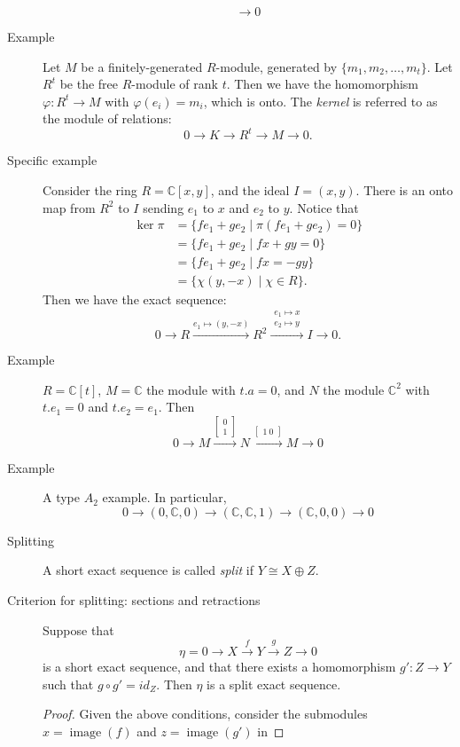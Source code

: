 \documentclass[12pt]{article}
\newcommand{\bbC}{\mathbb{C}}
\newcommand{\image}{\operatorname{image}}
\begin{document}
\begin{description}
\[    \rightarrow 0 \]
\item[Example] Let $M$ be a finitely-generated $R$-module, generated by
  $\{m_1,m_2,\dotsc, m_t\}$. Let $R^t$ be the free $R$-module of rank
  $t$. Then we have the homomorphism $\varphi: R^t \rightarrow M$ with
  $\varphi(e_i) = m_i$, which is onto. The \emph{kernel} is referred
  to as the module of relations: \[0 \rightarrow K \rightarrow R^t
    \rightarrow M \rightarrow 0.\]
\item[Specific example] Consider the ring $R=\bbC[x,y]$, and the ideal
  $I=(x,y).$ There is an onto map from $R^2$ to $I$ sending $e_1$ to
  $x$ and $e_2$ to $y$. Notice that
  \begin{align*}
    \ker \pi &= \{fe_1+ge_2 \mid \pi(fe_1+ge_2)=0\}\\
    &= \{fe_1+ge_2 \mid fx+gy=0\}\\
    &= \{fe_1+ge_2 \mid fx=-gy\}\\
    &= \{\chi (y,-x) \mid \chi \in R\}.
  \end{align*}
Then we have the exact sequence: 
  \[0 \rightarrow R\xrightarrow{e_1 \mapsto (y,-x)} R^2
    \xrightarrow{\begin{matrix} e_1 \mapsto x\\ e_2 \mapsto y\end{matrix}} I\rightarrow 0.\]
\item[Example] $R=\bbC[t]$, $M=\bbC$ the module with $t.a=0$, and $N$
  the module $\bbC^2$ with $t.e_1=0$ and
  $t.e_2=e_1$. Then \[0\rightarrow M \xrightarrow{\begin{bmatrix} 0\\1\end{bmatrix}} N
    \xrightarrow{\begin{bmatrix} 1\ 0\end{bmatrix} } M \rightarrow 0\]
\item[Example] A type $A_2$ example. In particular, \[0\rightarrow (0,\bbC,0)
    \rightarrow (\bbC,\bbC,1)\rightarrow (\bbC, 0, 0)\rightarrow 0\]
\item[Splitting] A short exact sequence is called \emph{split} if
  $Y\cong X\oplus Z$. 
\item[Criterion for splitting: sections and retractions] Suppose that 
  \[\eta=0 \rightarrow X \xrightarrow{f} Y \xrightarrow{g} Z \rightarrow
    0 \] is a short exact sequence, and that there exists a
  homomorphism $g': Z\rightarrow Y$ such that $g\circ g' = id_Z$. Then
  $\eta$ is a split exact sequence.
  \begin{proof}
    Given the above conditions, consider the submodules $x=\image(f)$ and $z=\image(g')$ in

\end{proof}
\end{description}
\end{document}
